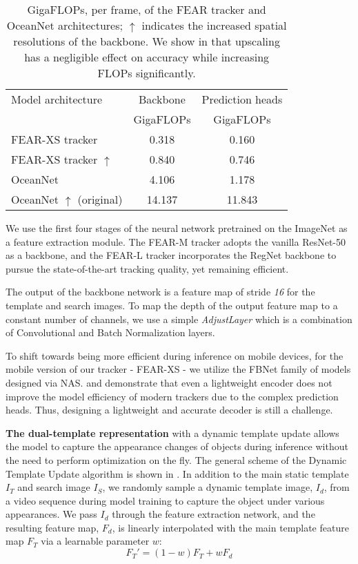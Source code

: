 \documentclass[runningheads]{llncs}
\begin{document}
\begin{table}[h]
\renewcommand{\arraystretch}{0.95}
\centering
\begin{tabular}{l||c|c}
Model architecture & Backbone & Prediction heads\\
 & GigaFLOPs & GigaFLOPs\\
\hline
FEAR-XS tracker & 0.318 & 0.160\\
FEAR-XS tracker $\uparrow$ & 0.840 & 0.746\\
OceanNet & 4.106 & 1.178 \\
OceanNet $\uparrow$ (original) & 14.137 & 11.843 \\
\end{tabular}
\vspace{0.75em}
\caption{GigaFLOPs, per frame, of the FEAR tracker and OceanNet \cite{Ocean} architectures; $\uparrow$ indicates the increased spatial resolutions of the backbone. We show in  that upscaling has a negligible effect on accuracy while increasing FLOPs significantly.} 
\label{t:flops}
\end{table} 
We use the first four stages of the neural network pretrained on the ImageNet \cite{ImageNet} as a feature extraction module. 
The FEAR-M tracker adopts the vanilla ResNet-50 \cite{ResNet} as a backbone, and the FEAR-L tracker incorporates the RegNet \cite{xu2021regnet} backbone to pursue the state-of-the-art tracking quality, yet remaining efficient.

The output of the backbone network is a feature map of stride \textit{16} for the template and search images. 
To map the depth of the output feature map to a constant number of channels, we use a simple \textit{AdjustLayer} which is a combination of Convolutional and Batch Normalization \cite{BatchNorm} layers. 

To shift towards being more efficient during inference on mobile devices, for the mobile version of our tracker - FEAR-XS - we utilize the FBNet \cite{FBNet} family of models designed via NAS.  and  demonstrate that even a lightweight encoder does not improve the model efficiency of modern trackers due to the complex prediction heads. Thus, designing a lightweight and accurate decoder is still a challenge.

\textbf{The dual-template representation} with a dynamic template update allows the model to capture the appearance changes of objects during inference without the need to perform optimization on the fly. 
The general scheme of the Dynamic Template Update algorithm is shown in .
In addition to the main static template $I_T$ and search image $I_S$, we randomly sample a dynamic template image, $I_{d}$, from a video sequence during model training to capture the object under various appearances. 
We pass $I_{d}$ through the feature extraction network, and the resulting feature map, $F_{d}$, is linearly interpolated with the main template feature map $F_T$ via a learnable parameter $w$:
\begin{equation} \label{eq1}
F_T' = (1 - w)F_T + w F_{d}
\end{equation}
\end{document}
